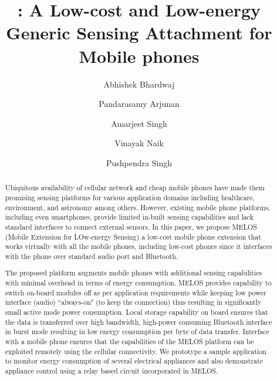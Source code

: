 \documentclass[10pt]{sigplan-proc-varsize}
\author[2]{Abhishek Bhardwaj}
\author[1]{Pandarasamy Arjunan }
\author[1]{Amarjeet Singh }
\author[1]{Vinayak Naik}
\author[1]{Pushpendra Singh\vspace{-3mm}}
\affil[1]{\vspace{-1mm}Indraprastha Institute of Information Technology, New Delhi, India}
\affil[2]{Netaji Subhash Institute of Technology, New Delhi, India\vspace{-4mm}}
\title{\vspace{-8mm} \melos: A Low-cost and Low-energy Generic Sensing Attachment for Mobile phones \vspace{-7mm}}
\newcommand{\melos}{MELOS }
\newcommand{\melosnospace}{MELOS}
\begin{document}
\maketitle


\begin{abstract}
Ubiquitous availability of cellular network and cheap mobile phones have made them promising sensing platforms for various application domains including healthcare, environment, and astronomy among others. However, existing mobile phone platforms, including even smartphones, provide limited in-built sensing capabilities and lack standard interfaces to connect external sensors. In this paper, we propose \melos (Mobile Extension for LOw-energy Sensing) a low-cost mobile phone extension that works virtually with all the mobile phones, including low-cost phones since it interfaces with the phone over standard audio port and Bluetooth. 

The proposed platform augments mobile phones with additional sensing capabilities with minimal overhead in terms of energy consumption. \melos provides capability to switch on-board modules off as per application requirements while keeping low power interface (audio) ``always-on" (to keep the connection) thus resulting in significantly small active mode power consumption. Local storage capability on board ensures that the data is transferred over high bandwidth, high-power consuming Bluetooth interface in burst mode resulting in low energy consumption per byte of data transfer. Interface with a mobile phone ensures that the capabilities of the \melos platform can be exploited remotely using the cellular connectivity. We prototype a sample application to monitor energy consumption of several electrical appliances and also demonstrate appliance control using a relay based circuit incorporated in \melosnospace. 
\end{abstract}

%
%



\end{document}

